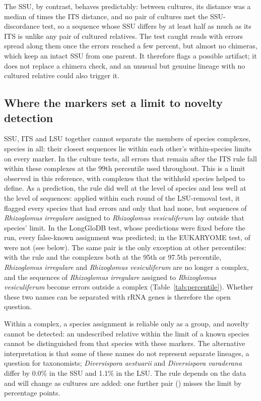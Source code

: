 \documentclass[11pt]{article}
\newcommand{\spn}[1]{\emph{#1}}   %
\begin{document}
The SSU, by contrast, behaves predictably: between cultures, its distance was a median of \ThrPairsRatio{} times the
ITS distance, and no pair of cultures met the SSU-discordance test, so a sequence whose SSU differs by at least half as
much as its ITS is unlike any pair of cultured relatives. The test caught reads with errors spread along them once the
errors reached a few percent, but almost no chimeras, which keep an intact SSU from one parent. It therefore flags a
possible artifact; it does not replace a chimera check, and an unusual but genuine lineage with no cultured relative
could also trigger it.

\subsection{Where the markers set a limit to novelty detection}
SSU, ITS and LSU together cannot separate the members of \NComplexes{} species complexes, \NComplexSpecies{} species
in all: their closest sequences lie within each other's within-species limits on every marker. In the culture
tests, all errors that remain after the ITS rule fall within these complexes at the 99th percentile used throughout. This is a limit observed in
this reference, with complexes that the withheld species helped to define. As a prediction, the rule did well at the
level of species and less well at the level of sequences: applied within each round of the LSU-removal test, it
flagged every species that had errors and only \FwInsideNoFK{} that had none, but \FwCopyOutsideVTwo{} sequences
of \spn{Rhizoglomus irregulare} assigned to \spn{Rhizoglomus vesiculiferum} lay outside that species' limit. In the
LongGloDB test, whose predictions were fixed before the run, every false-known assignment was predicted; in the
EUKARYOME test, \EkFxOutside{} of \EkFK{} were not (see below). The same pair is the only exception at other percentiles: with the rule and the complexes
both at the 95th or 97.5th percentile, \spn{Rhizoglomus irregulare} and \spn{Rhizoglomus vesiculiferum} are no longer
a complex, and the sequences of \spn{Rhizoglomus irregulare} assigned to \spn{Rhizoglomus vesiculiferum} become
errors outside a complex (Table~\ref{tab:percentile}). Whether these two names can be separated with rRNA genes is
therefore the open question.

Within a complex, a species assignment is reliable only as a group, and novelty cannot be detected: an undescribed
relative within the limit of a known species cannot be distinguished from that species with these markers. The
alternative interpretation is that some of these names do not represent separate lineages, a question for
taxonomists; \spn{Diversispora aestuarii} and \spn{Diversispora varaderana} differ by 0.0\% in the SSU and 1.1\% in
the LSU. The rule depends on the data and will change as cultures are added: one further pair (\NearMissPair{})
misses the \NearMissMarker{} limit by \NearMissPoints{} percentage points.
\end{document}
